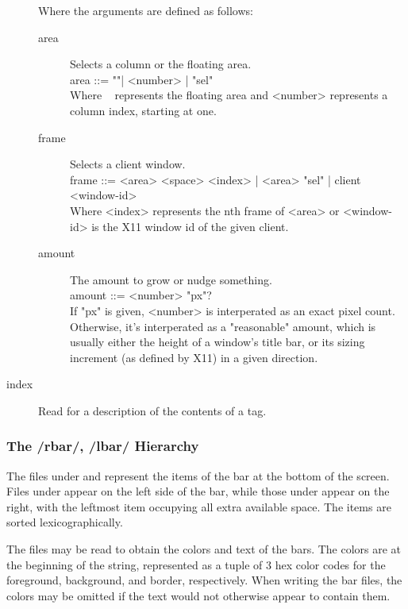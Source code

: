 \begin{description}
        Where the arguments are defined as follows:
        \begin{description}
        \item[area] Selects a column or the floating area. \\
            \SP\SP area ::= "\Tilde"\SP | <number> | "sel" \\
            Where ~ represents the floating area and <number>
            represents a column index, starting at one.
        \item[frame] Selects a client window. \\
            \SP\SP frame ::= <area> <space> <index> | <area> "sel" | client <window-id> \\
            Where <index> represents the nth frame of <area> or
            <window-id> is the X11 window id of the given client.
        \item[amount] The amount to grow or nudge something. \\
            \SP\SP amount ::= <number> "px"? \\
            If "px" is given, <number> is interperated as an exact
            pixel count. Otherwise, it's interperated as a "reasonable"
            amount, which is usually either the height of a window's title
            bar, or its sizing increment (as defined by X11) in a given
            direction.
	\end{description}

\item[index] Read for a description of the contents of a tag.
\end{description}

\subsubsection{The /rbar/, /lbar/ Hierarchy}

The files under  and  represent the
items of the bar at the bottom of the screen. Files under
 appear on the left side of the bar, while those
under  appear on the right, with the leftmost item
occupying all extra available space. The items are sorted
lexicographically.

The files may be read to obtain the colors and text of the bars.
The colors are at the beginning of the string, represented as a
tuple of 3 hex color codes for the foreground, background, and
border, respectively. When writing the bar files, the colors may
be omitted if the text would not otherwise appear to contain
them.

